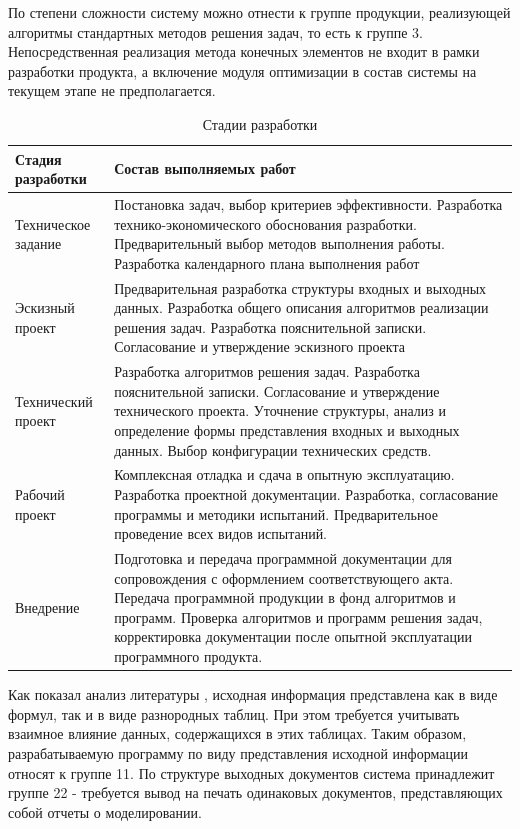 \documentclass[14pt,oneside,final]{extreport}
\begin{document}
	По степени сложности систему можно отнести к группе продукции, реализующей алгоритмы стандартных методов 
	решения задач, то есть к группе 3. Непосредственная реализация метода конечных элементов не входит в рамки разработки продукта, а включение модуля оптимизации в состав системы  на текущем этапе не предполагается.  \newpage

		\begin{table}[h!]
			\centering
			\caption{Стадии разработки}\label{tab:economy} 
			\begin{tabularx}{\textwidth}{|l|X|}
				
				\hline Стадия разработки & \multicolumn{1}{Z|}{Состав выполняемых работ }\\ 
				\hline Техническое задание & Постановка задач, выбор критериев эффективности. Разработка технико-экономического обоснования разработки. Предварительный выбор методов выполнения работы. Разработка календарного плана выполнения работ   \\ 
				\hline Эскизный проект & Предварительная разработка структуры входных и выходных данных. Разработка общего описания алгоритмов реализации решения задач. Разработка пояснительной записки. Согласование и утверждение эскизного проекта \\ 
				\hline Технический проект & Разработка алгоритмов решения задач. Разработка пояснительной записки. Согласование и утверждение технического проекта. Уточнение структуры, анализ и определение формы представления входных и выходных данных. Выбор конфигурации технических средств.  \\ 			
				\hline Рабочий проект & Комплексная отладка и сдача в опытную эксплуатацию. Разработка проектной документации. Разработка, согласование программы и методики испытаний. Предварительное проведение всех видов  испытаний.   \\ 			
				\hline Внедрение & Подготовка и передача программной документации для сопровождения с оформлением соответствующего акта. Передача программной продукции в фонд алгоритмов и программ. Проверка алгоритмов и программ решения задач, корректировка документации после опытной эксплуатации программного продукта. \\ 
				\hline 
			\end{tabularx}
		\end{table}
		
		
	Как показал анализ литературы \cite{book:Kosilova}, исходная информация представлена как в виде формул, так и в виде разнородных таблиц. При этом требуется учитывать взаимное влияние данных, содержащихся в этих таблицах. Таким образом, разрабатываемую программу по виду представления исходной информации относят к группе 11. По структуре выходных документов система принадлежит группе 22 - требуется вывод на печать одинаковых документов, представляющих собой отчеты о моделировании.
	
\end{document}

